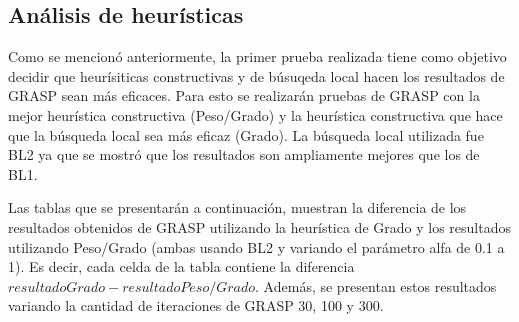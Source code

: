\documentclass[a4paper,11pt] {article}
\begin{document}
\subsection*{An\'alisis de heur\'isticas}

Como se mencion\'o anteriormente, la primer prueba realizada tiene como objetivo decidir que heur\'isiticas constructivas y de b\'usuqeda local hacen los resultados de GRASP sean m\'as eficaces. Para esto se realizar\'an pruebas de GRASP con la mejor heur\'istica constructiva (Peso/Grado) y la heur\'istica constructiva que hace que la b\'usqueda local sea m\'as eficaz (Grado). La b\'usqueda local utilizada fue BL2 ya que se mostr\'o que los resultados son ampliamente mejores que los de BL1.

Las tablas que se presentar\'an a continuaci\'on, muestran la diferencia de los resultados obtenidos de GRASP utilizando la heur\'istica de Grado y los resultados utilizando Peso/Grado (ambas usando BL2 y variando el par\'ametro alfa de 0.1 a 1). Es decir, cada celda de la tabla contiene la diferencia $resultadoGrado - resultadoPeso/Grado$.  Adem\'as, se presentan estos resultados variando la cantidad de iteraciones de GRASP 30, 100 y 300.
\end{document}
